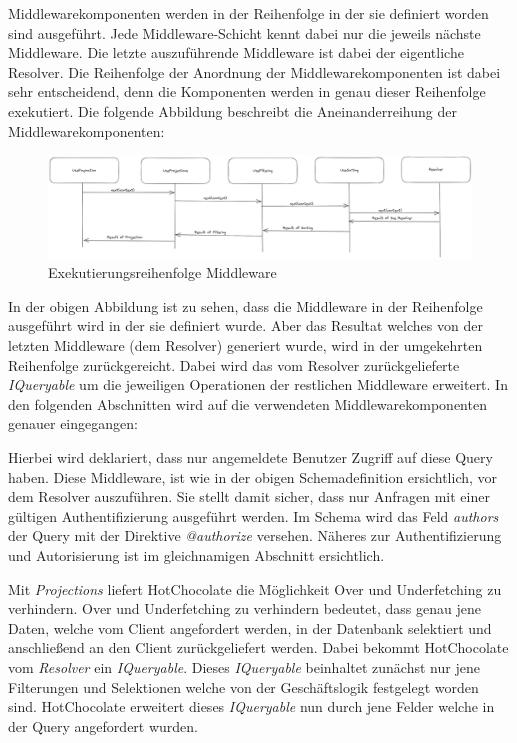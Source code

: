 Middlewarekomponenten werden in der Reihenfolge in der sie definiert worden sind ausgeführt.
Jede Middleware-Schicht kennt dabei nur die jeweils nächste Middleware.
Die letzte auszuführende Middleware ist dabei der eigentliche Resolver.
Die Reihenfolge der Anordnung der Middlewarekomponenten ist dabei sehr entscheidend, denn die Komponenten werden in genau dieser Reihenfolge exekutiert.
Die folgende Abbildung beschreibt die Aneinanderreihung der Middlewarekomponenten:

\begin{figure}[H]
    \includegraphics[width=\textwidth]{pics/middleware.png}
    \caption{Exekutierungsreihenfolge Middleware}
\end{figure}

In der obigen Abbildung ist zu sehen, dass die Middleware in der Reihenfolge ausgeführt wird in der sie definiert wurde.
Aber das Resultat welches von der letzten Middleware (dem Resolver) generiert wurde, wird in der umgekehrten Reihenfolge zurückgereicht.
Dabei wird das vom Resolver zurückgelieferte \textit{IQueryable} um die jeweiligen Operationen der restlichen Middleware erweitert.
In den folgenden Abschnitten wird auf die verwendeten Middlewarekomponenten genauer eingegangen: 

Hierbei wird deklariert, dass nur angemeldete Benutzer Zugriff auf diese Query haben.
Diese Middleware, ist wie in der obigen Schemadefinition ersichtlich, vor dem Resolver auszuführen.
Sie stellt damit sicher, dass nur Anfragen mit einer gültigen Authentifizierung ausgeführt werden.
Im Schema wird das Feld \textit{authors} der Query mit der Direktive \textit{@authorize} versehen.
Näheres zur Authentifizierung und Autorisierung ist im gleichnamigen Abschnitt ersichtlich.

Mit \textit{Projections} liefert HotChocolate die Möglichkeit Over und Underfetching zu verhindern.
Over und Underfetching zu verhindern bedeutet, dass genau jene Daten, welche vom Client angefordert werden, in der Datenbank selektiert und anschließend an den Client zurückgeliefert werden.
Dabei bekommt HotChocolate vom \textit{Resolver} ein \textit{IQueryable}.
Dieses \textit{IQueryable} beinhaltet zunächst nur jene Filterungen und Selektionen welche von der Geschäftslogik festgelegt worden sind.
HotChocolate erweitert dieses \textit{IQueryable} nun durch jene Felder welche in der Query angefordert wurden.

